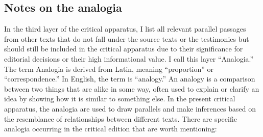 \subsection{Notes on the analogia}

In the third layer of the critical apparatus, I list all relevant parallel passages from other texts that do not fall under the source texts or the testimonies but should still be included in the critical apparatus due to their significance for editorial decisions or their high informational value. I call this layer ``Analogia.'' The term Analogia is derived from Latin, meaning ``proportion'' or ``correspondence.'' In English, the term is ``analogy.'' An analogy is a comparison between two things that are alike in some way, often used to explain or clarify an idea by showing how it is similar to something else. In the present critical apparatus, the analogia are used to draw parallels and make inferences based on the resemblance of relationships between different texts. There are specific analogia occurring in the critical edition that are worth mentioning:

